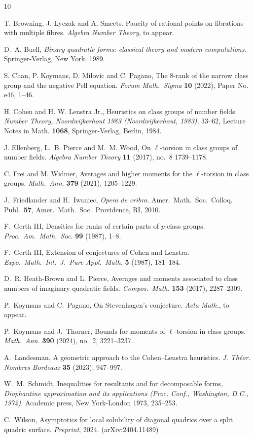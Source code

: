 \documentclass[reqno, 12pt, twoside]{amsart}
\numberwithin{equation}{section}
\newcommand{\0}{\mathbf{0}}
\theoremstyle{definition}
\begin{document}
\begin{thebibliography}{10}


T. Browning, J. Lyczak and A. Smeets. 
Paucity of rational points on fibrations with multiple fibres. 
{\em Algebra Number Theory}, to appear.

D.~A. Buell,
 {\em Binary quadratic forms: classical theory and modern computations}. Springer-Verlag, New York, 1989.

S. Chan, P. Koymans, D. Milovic and C. Pagano, 
The 8-rank of the narrow class group and the negative Pell equation.
{\em Forum Math.\ Sigma} {\bf 10} (2022), Paper No. e46, 1--46.

H. Cohen and H. W. Lenstra Jr.,
Heuristics on class groups of number fields. 
{\em Number Theory, Noordwijkerhout 1983 (Noordwijkerhout, 1983)}, 33--62, Lecture Notes in Math. {\bf 1068}, Springer-Verlag, Berlin, 1984.

J. Ellenberg, L.~B. Pierce and M.~M. Wood, 
On $\ell$-torsion in class groups of number fields.
{\em Algebra Number Theory} {\bf 11} (2017), no.~8
1739--1178.

C. Frei and M. Widmer,
Averages and higher moments for the $\ell$-torsion in class groups.
{\em Math.\ Ann.} 
{\bf 379} (2021), 1205--1229.

J.~Friedlander and H.~Iwaniec,
 {\em Opera de cribro}. Amer.\ Math.\
  Soc.\ Colloq. Publ.\  {\bf 57}, 
 Amer.\ Math.\ Soc.\, Providence, RI, 2010.

F.~Gerth III, Densities for ranks of certain parts of $p$-class groups. {\em Proc.\ Am.\ Math.\ Soc.}
{\bf 99} (1987), 1--8.

F.~Gerth III, Extension of conjectures of Cohen and Lenstra. {\em Expo.\ Math.\ Int.\ J.\ Pure Appl.\
Math.} {\bf 5} (1987), 181--184.

D.~R. Heath-Brown and L. Pierce,
Averages and moments associated to class numbers of imaginary quadratic fields.
{\em Compos.\ Math.} {\bf 153} (2017),  2287--2309.

P.~Koymans and C.~Pagano,
On Stevenhagen's conjecture.
{\em Acta Math.}, to appear.

P.~Koymans and J.~Thorner,
Bounds for moments of $\ell$-torsion in class groups.
{\em Math.\ Ann.}
{\bf 390} (2024), no.~2, 3221--3237.  
 
A.~Landesman,
A geometric approach to the Cohen--Lenstra heuristics.
{\em J. Th\'eor. Nombres Bordeaux}
{\bf  35} (2023), 947--997.


W.~M.~Schmidt, Inequalities for resultants and for decomposable forms,
{\em Diophantine approximation and its applications (Proc. Conf., Washington, D.C., 1972)}, Academic press, New York-London 1973, 235--253.


C.~Wilson, Asymptotics for local solubility of diagonal quadrics over a split quadric surface.
{\em Preprint}, 2024. (arXiv:2404.11489)


\end{thebibliography}
\end{document}
